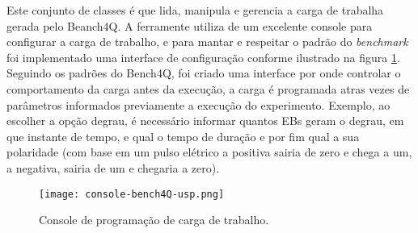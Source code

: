 Este conjunto de classes é que lida, manipula e gerencia a carga de trabalha gerada pelo Beanch4Q. A ferramente utiliza de um excelente console para configurar a carga de trabalho, e para mantar e respeitar o padrão do \textit{benchmark} foi implementado uma interface de configuração conforme ilustrado na figura \ref{fig:interface-criada-beanch4q}. Seguindo os padrões do Bench4Q, foi criado uma interface por onde controlar o comportamento da carga antes da execução, a carga é programada atras vezes de parâmetros informados previamente a execução do experimento. Exemplo, ao escolher a opção degrau, é necessário informar quantos EBs geram o degrau, em que instante de tempo, e qual o tempo de duração e por fim qual a sua polaridade (com base em um pulso elétrico a positiva sairia de zero e chega a um, a negativa, sairia de um e chegaria a zero).

\begin{figure}[htb]
	\centering
	\texttt{[image: console-bench4Q-usp.png]}
	\caption{Console de programação de carga de trabalho.}
	\label{fig:interface-criada-beanch4q}
	\fautor
\end{figure}





